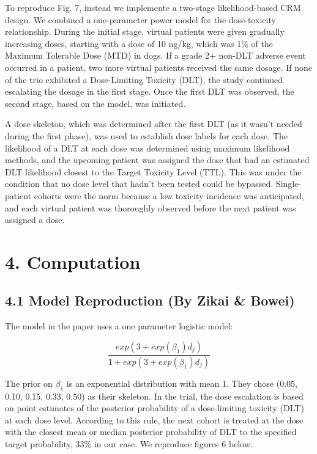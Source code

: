 \documentclass[
]{article}
\begin{document}
To reproduce Fig. 7, instead we implemente a two-stage likelihood-based
CRM design. We combined a one-parameter power model for the
dose-toxicity relationship. During the initial stage, virtual patients
were given gradually increasing doses, starting with a dose of 10 ng/kg,
which was 1\% of the Maximum Tolerable Dose (MTD) in dogs. If a grade 2+
non-DLT adverse event occurred in a patient, two more virtual patients
received the same dosage. If none of the trio exhibited a Dose-Limiting
Toxicity (DLT), the study continued escalating the dosage in the first
stage. Once the first DLT was observed, the second stage, based on the
model, was initiated.

A dose skeleton, which was determined after the first DLT (as it wasn't
needed during the first phase), was used to establish dose labels for
each dose. The likelihood of a DLT at each dose was determined using
maximum likelihood methods, and the upcoming patient was assigned the
dose that had an estimated DLT likelihood closest to the Target Toxicity
Level (TTL). This was under the condition that no dose level that hadn't
been tested could be bypassed. Single-patient cohorts were the norm
because a low toxicity incidence was anticipated, and each virtual
patient was thoroughly observed before the next patient was assigned a
dose.

\hypertarget{computation}{%
\section{4. Computation}\label{computation}}

\hypertarget{model-reproduction-by-zikai-bowei}{%
\subsection{4.1 Model Reproduction (By Zikai \&
Bowei)}\label{model-reproduction-by-zikai-bowei}}

The model in the paper uses a one parameter logistic model:

\[
\frac{exp(3+exp(\beta_1)d_j)}{1+exp(3+exp(\beta_1)d_j)}
\]

The prior on \(\beta_1\) is an exponential distribution with mean 1.
They chose (0.05, 0.10, 0.15, 0.33, 0.50) as their skeleton. In the
trial, the dose escalation is based on point estimates of the posterior
probability of a dose-limiting toxicity (DLT) at each dose level.
According to this rule, the next cohort is treated at the dose with the
closest mean or median posterior probability of DLT to the specified
target probability, 33\% in our case. We reproduce figures 6 below.
\end{document}
